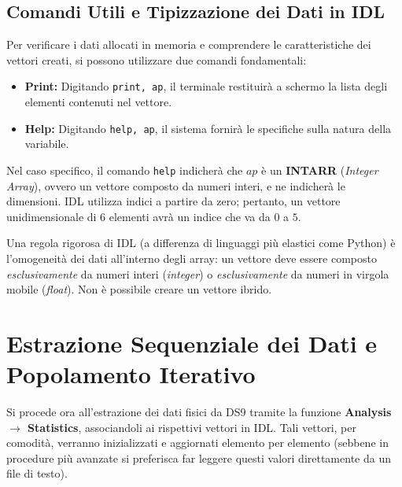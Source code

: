 \subsection{Comandi Utili e Tipizzazione dei Dati in IDL}

Per verificare i dati allocati in memoria e comprendere le caratteristiche dei vettori creati, si possono utilizzare due comandi fondamentali:

\begin{itemize}
\item \textbf{Print:} Digitando \texttt{print, ap}, il terminale restituirà a schermo la lista degli elementi contenuti nel vettore.
\item \textbf{Help:} Digitando \texttt{help, ap}, il sistema fornirà le specifiche sulla natura della variabile.
\end{itemize}

Nel caso specifico, il comando \texttt{help} indicherà che $ap$ è un \textbf{INTARR} (\textit{Integer Array}), ovvero un vettore composto da numeri interi, e ne indicherà le dimensioni. IDL utilizza indici a partire da zero; pertanto, un vettore unidimensionale di 6 elementi avrà un indice che va da $0$ a $5$.

Una regola rigorosa di IDL (a differenza di linguaggi più elastici come Python) è l'omogeneità dei dati all'interno degli array: un vettore deve essere composto \textit{esclusivamente} da numeri interi (\textit{integer}) o \textit{esclusivamente} da numeri in virgola mobile (\textit{float}). Non è possibile creare un vettore ibrido.

\section{Estrazione Sequenziale dei Dati e Popolamento Iterativo}

Si procede ora all'estrazione dei dati fisici da DS9 tramite la funzione \textbf{Analysis $\rightarrow$ Statistics}, associandoli ai rispettivi vettori in IDL. Tali vettori, per comodità, verranno inizializzati e aggiornati elemento per elemento (sebbene in procedure più avanzate si preferisca far leggere questi valori direttamente da un file di testo).

